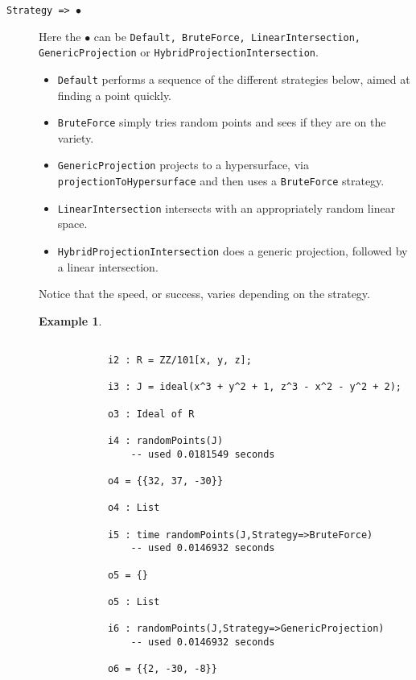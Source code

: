 \documentclass[11pt]{amsart}
\theoremstyle{definition}
\newtheorem{example}{Example}[section]
\begin{document}
\begin{description}		
\item[\tt Strategy => $\bullet$]   Here the $\bullet$ can be {\tt Default, BruteForce, LinearIntersection, \\ GenericProjection} or {\tt HybridProjectionIntersection}.

  \begin{itemize}
  \item {\tt Default} performs a sequence of the different strategies below, aimed at finding a point quickly.    
  \item {\tt BruteForce} simply tries random points and sees if they are on the variety.
    
  \item {\tt GenericProjection} projects to a hypersurface, via 
    {\tt projectionToHypersurface} and then uses a {\tt BruteForce} strategy.
    
  \item {\tt LinearIntersection} intersects with an appropriately random linear space.
    
  \item {\tt HybridProjectionIntersection} does a generic projection, followed by a linear intersection. 		
  \end{itemize}

  Notice that the speed, or success, varies depending on the strategy.

  \begin{example}\label{BruteForce}
    ~~
    
    {{\small\color{blue}
\begin{verbatim}

			i2 : R = ZZ/101[x, y, z];
			
			i3 : J = ideal(x^3 + y^2 + 1, z^3 - x^2 - y^2 + 2);
			
			o3 : Ideal of R
			
			i4 : randomPoints(J)
				-- used 0.0181549 seconds

			o4 = {{32, 37, -30}}
			
			o4 : List
			
			i5 : time randomPoints(J,Strategy=>BruteForce)
				-- used 0.0146932 seconds

			o5 = {}
			
			o5 : List
			
			i6 : randomPoints(J,Strategy=>GenericProjection)
				-- used 0.0146932 seconds

			o6 = {{2, -30, -8}}
			

\end{verbatim}}}
\end{example}
\end{description}
\end{document}
